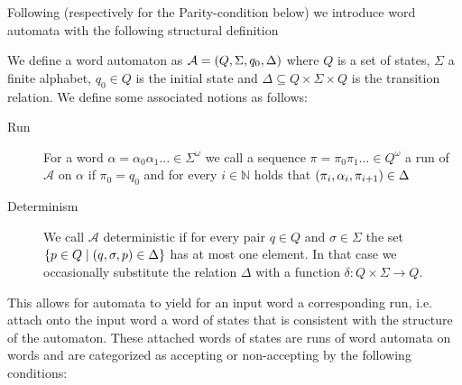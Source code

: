\label{sec:wordautomata}
Following \cite{LangAutoLog} (respectively \cite[Chapter 1]{AutoLogInfGames}
for the Parity-condition below) we introduce word automata with the following
structural definition
\begin{definition}
  We define a word automaton as
  $\mathcal{A} = \left(Q, \Sigma, q_{0}, \Delta\right)$ where
  $Q$ is a set of states, $\Sigma$ a finite alphabet, $q_{0}\in Q$ is the
  initial state and $\Delta\subseteq Q\times\Sigma\times Q$ is the transition
  relation. We define some associated notions as follows:
  \begin{description}
    \item [Run]
      For a word $\alpha = \alpha_{0}\alpha_{1}\dots\in\Sigma^{\omega}$ we call
      a sequence $\pi = \pi_{0}\pi_{1}\dots \in Q^{\omega}$ a run of
      $\mathcal{A}$ on $\alpha$ if $\pi_{0} = q_{0}$ and for every
      $i\in\mathbb{N}$ holds that
      $\left(\pi_{i}, \alpha_{i}, \pi_{i+1}\right)\in\Delta$
    \item [Determinism]
      We call $\mathcal{A}$ deterministic if for every pair $q\in Q$ and
      $\sigma\in\Sigma$ the set
      $\left\{p\in Q\mid\left(q,\sigma,p\right)\in\Delta\right\}$ has at most one
      element. In that case we occasionally substitute the relation $\Delta$ 
      with a function $\delta:Q\times\Sigma\rightarrow Q$.
  \end{description}
\end{definition}
This allows for automata to yield for an input word a corresponding run, i.e.
attach onto the input word a word of states that is consistent with the
structure of the automaton. These attached words of states are runs of word
automata on words and are categorized as accepting or non-accepting by the
following conditions:
